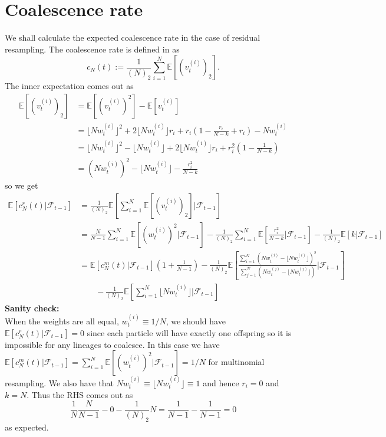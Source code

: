 \documentclass[fleqn]{article}
\newcommand{\E}{\mathbb{E}}
\newcommand{\F}{\mathcal{F}_{t-1}}
\newcommand{\vt}[2][t]{v_{#1}^{(#2)}}
\newcommand{\wt}[2][t]{w_{#1}^{(#2)}}
\begin{document}
\section{Coalescence rate}
We shall calculate the expected coalescence rate in the case of residual resampling. The coalescence rate is defined in \citet{koskela2018} as
\begin{equation*}
c_N(t) := \frac{1}{(N)_2} \sum_{i=1}^{N} \E\left[ (\vt{i})_2 \right].
\end{equation*}
The inner expectation comes out as
\begin{align*}
\E[(\vt{i})_2] &= \E[(\vt{i})^2] - \E[\vt{i}] \\
&= \lfloor N\wt{i} \rfloor^2 + 2\lfloor N\wt{i} \rfloor r_i + r_i \left(1 - \frac{r_i}{N-k} + r_i \right) - N\wt{i} \\
&= \lfloor N\wt{i} \rfloor^2 - \lfloor N\wt{i} \rfloor + 2\lfloor N\wt{i} \rfloor r_i + r_i^2 \left(1- \frac{1}{N-k} \right) \\
&= (N\wt{i})^2 - \lfloor N\wt{i} \rfloor - \frac{r_i^2}{N-k}
\end{align*}
so we get
\begin{align*}
\E[c^r_N(t) |\F] &=  \frac{1}{(N)_2} \E\left[ \sum_{i=1}^{N} \E[(\vt{i})_2] |\F \right] \\
&= \frac{N}{N-1} \sum_{i=1}^{N} \E[(\wt{i})^2 |\F] - \frac{1}{(N)_2} \sum_{i=1}^{N} \E\left[ \frac{r_i^2}{N-k} |\F \right] - \frac{1}{(N)_2} \E[k |\F] \\
&= \E[c^{m}_N(t) |\F] \left( 1 + \frac{1}{N-1} \right) - \frac{1}{(N)_2}  \E\left[ \frac{\sum_{i=1}^{N} (N\wt{i} - \lfloor N\wt{i}\rfloor)^2}{\sum_{j=1}^{N} (N\wt{j} - \lfloor N\wt{j}\rfloor)} |\F \right] \\
&\qquad -\frac{1}{(N)_2} \E \left[ \sum_{i=1}^{N} \lfloor N\wt{i}\rfloor |\F \right]
\end{align*}
\textbf{Sanity check:}\\
When the weights are all equal, $\wt{i} \equiv 1/N$, we should have $\E[c^r_N(t) |\F] = 0$ since each particle will have exactly one offspring so it is impossible for any lineages to coalesce. In this case we have $\E[c^{m}_N(t) |\F] = \sum_{i=1}^{N} \E[(\wt{i})^2 |\F] = 1/N$ for multinomial resampling. We also have that $N\wt{i} \equiv \lfloor N\wt{i} \rfloor \equiv 1$ and hence $r_i = 0$ and $k=N$. Thus the RHS comes out as
\begin{equation*}
\frac{1}{N}\frac{N}{N-1} - 0 - \frac{1}{(N)_2} N = \frac{1}{N-1} - \frac{1}{N-1} = 0
\end{equation*}
as expected.


\end{document}
